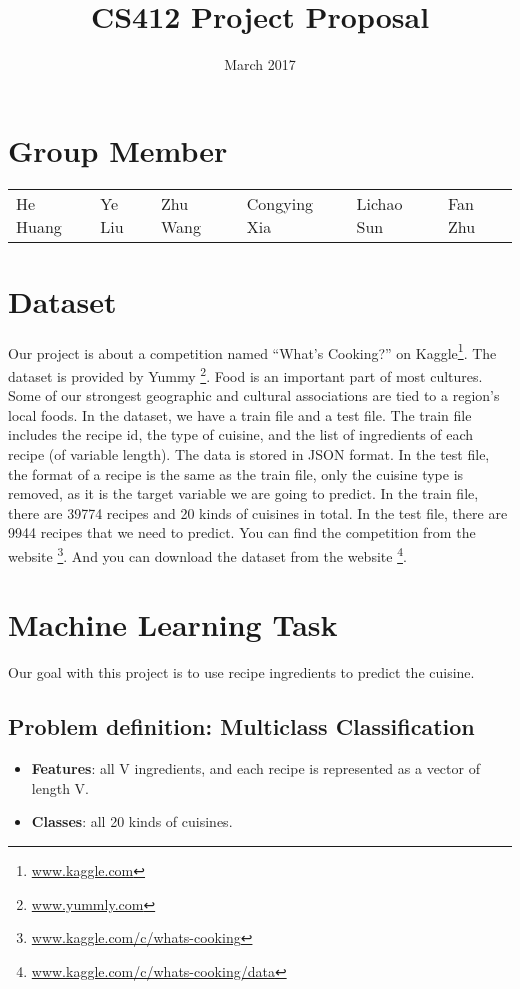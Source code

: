 \documentclass{article}
\title{CS412 Project Proposal}
\date{March 2017}
\begin{document}
\maketitle

\section{Group Member}
\begin{tabular}{l l l l l l}
    He Huang & Ye Liu & Zhu Wang & Congying Xia & Lichao Sun & Fan Zhu
\end{tabular}
\section{Dataset}
Our project is about a competition named “What’s Cooking?” on Kaggle\footnote[1]{\url{www.kaggle.com}}. The dataset is provided by Yummy \footnote[2]{\url{www.yummly.com}}.  
Food is an important part of most cultures. Some of our strongest geographic and cultural associations are tied to a region's local foods. In the dataset, we have a train file and a test file. The train file includes the recipe id, the type of cuisine, and the list of ingredients of each recipe (of variable length). The data is stored in JSON format. In the test file, the format of a recipe is the same as the train file, only the cuisine type is removed, as it is the target variable we are going to predict.
In the train file, there are 39774 recipes and 20 kinds of cuisines in total. In the test file, there are 9944 recipes that we need to predict.
You can find the competition from the website        		   \footnote[3]{\url{www.kaggle.com/c/whats-cooking}}.
And you can download the dataset from the website		 \footnote[4]{\url{www.kaggle.com/c/whats-cooking/data}}.
\section{Machine Learning Task}
Our goal with this project is to use recipe ingredients to predict the cuisine.
\subsection{Problem definition:  Multiclass Classification}
\begin{itemize}
    \item \textbf{Features}: all V ingredients, and each recipe is represented as a vector of length V.
    \item \textbf{Classes}: all 20 kinds of cuisines. 
\end{itemize}
\end{document}
